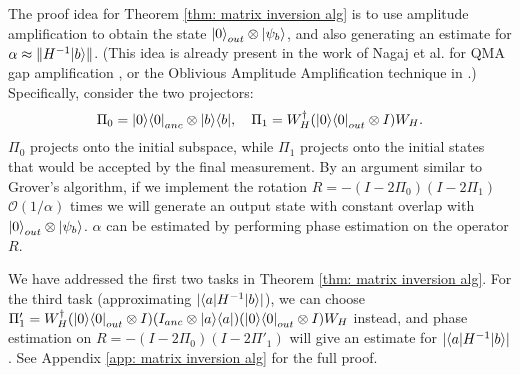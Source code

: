 \documentclass[11pt]{article}
\theoremstyle{definition}
\theoremstyle{remark}
\newcommand\bigoh{\mathcal{O}}
\begin{document}
The proof idea for Theorem \ref{thm: matrix inversion alg} is to use amplitude amplification to obtain the state ${\left\vert{0}\right\rangle}_{out} \otimes {\left\vert{\psi_b}\right\rangle}$, and also generating an estimate for $\alpha \approx \|H^{-1}{\left\vert{b}\right\rangle}\|$. (This idea is already present in the work of Nagaj et al. for QMA gap amplification \cite{nwz11}, or the Oblivious Amplitude Amplification technique in \cite{berry14,bccks15,berry15}.) Specifically, consider the two projectors:
\begin{equation}
\Pi_0 = {\left\vert{0}\right\rangle}{\left\langle{0}\right\vert}_{anc} \otimes {\left\vert{b}\right\rangle}{\left\langle{b}\right\vert}, \quad \Pi_1 = W_H^\dagger ({\left\vert{0}\right\rangle}{\left\langle{0}\right\vert}_{out} \otimes I) W_H.
\end{equation}
$\Pi_0$ projects onto the initial subspace, while $\Pi_1$ projects onto the initial states that would be accepted by the final measurement. By an argument similar to Grover's algorithm, if we implement the rotation $R=-(I-2\Pi_0)(I-2\Pi_1)$ $\bigoh (1/\alpha)$ times we will generate an output state with constant overlap with ${\left\vert{0}\right\rangle}_{out} \otimes {\left\vert{\psi_b}\right\rangle}$. $\alpha$ can be estimated by performing phase estimation on the operator $R$.

We have addressed the first two tasks in Theorem \ref{thm: matrix inversion alg}. For the third task (approximating $|{\left\langle{a}\right\vert}H^{-1}{\left\vert{b}\right\rangle}|$), we can choose $\Pi'_1 = W_H^\dagger ({\left\vert{0}\right\rangle}{\left\langle{0}\right\vert}_{out} \otimes I) (I_{anc} \otimes {\left\vert{a}\right\rangle}{\left\langle{a}\right\vert})({\left\vert{0}\right\rangle}{\left\langle{0}\right\vert}_{out} \otimes I) W_H$ instead, and phase estimation on $R=-(I-2\Pi_0)(I-2\Pi'_1)$ will give an estimate for $|{\left\langle{a}\right\vert}H^{-1}{\left\vert{b}\right\rangle}|$. See Appendix \ref{app: matrix inversion alg} for the full proof.
\end{document}
